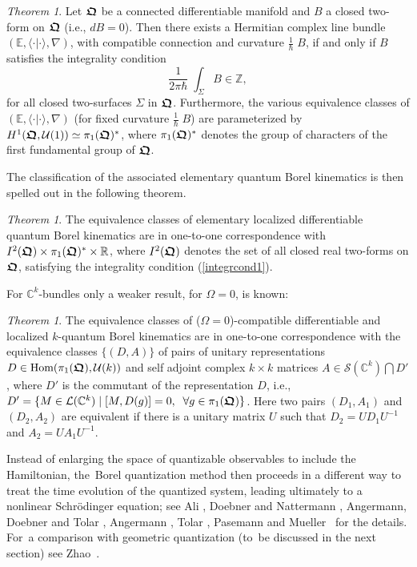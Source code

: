 \documentclass[11pt]{amsart}
\numberwithin{equation}{section}
\theoremstyle{remark}
\newtheorem{theorem}[defi]{Theorem}
\newcommand{\betheo}{\begin{theorem}}
\newcommand{\entheo}{\end{theorem}}
\newcommand{\be}{\begin{equation}}
\newcommand{\en}{\end{equation}}
\newcommand{\bfrakQ}{\mbox{\boldmath $\mathfrak Q$}}
\begin{document}
\betheo
Let $\bfrakQ$ be a connected differentiable manifold and $B$ a closed two-form
on $\bfrakQ$ (i.e., $dB = 0$). Then there exists a Hermitian complex line
bundle $(\mathbb E , \langle\cdot \vert\cdot\rangle , \nabla )$, with
compatible connection and curvature $\frac 1\hbar\;B$, if and only if $B$
satisfies the integrality condition
\be
  \frac 1{2\pi\hbar}\; \int_{\Sigma}B \in \mathbb Z ,
\label{integrcond1}
\en
for all closed two-surfaces $\Sigma$ in $\bfrakQ$. Furthermore, the various
equivalence classes of  $(\mathbb E , \langle\cdot\vert\cdot\rangle , \nabla )$
(for fixed curvature $\frac 1\hbar\;B$) are parameterized by $H^1 (\bfrakQ,
{\mathcal U}(1))\simeq \pi_1 (\bfrakQ )^*$, where $\pi_1 (\bfrakQ )^*$ denotes
the group of characters of the first fundamental group of $\bfrakQ$.
\entheo

The classification of the associated elementary quantum Borel kinematics is
then spelled out in the following theorem.

\betheo\label{classiftheo}
The equivalence classes of elementary localized
differentiable quantum Borel kinematics are in one-to-one correspondence with
$I^2 (\bfrakQ )\times \pi_1 (\bfrakQ )^* \times {\mathbb R}$, where $I^2
(\bfrakQ )$ denotes the set of all closed real two-forms on $\bfrakQ$,
satisfying the integrality condition (\ref{integrcond1}).
\entheo

For ${\mathbb C}^k$-bundles only a weaker result, for $\Omega = 0$, is known:

\betheo
The equivalence classes of ($\Omega = 0$)-compatible differentiable and
localized $k$-quantum Borel kinematics are in one-to-one correspondence with
the equivalence classes $\{(D, A)\}$ of pairs of unitary representations
$D \in \mbox{\rm Hom}(\pi_1 (\bfrakQ ), {\mathcal U} (k))$ and self adjoint
complex $k\times k$ matrices $A \in {\mathcal S}({\mathbb C}^k )\bigcap D'$,
where $D'$ is the commutant of the representation $D$, i.e.,
$D' = \{ M \in {\mathcal L} ({\mathbb C}^k )\;\vert\; [M, D(g)] = 0, \;\;
\forall g \in \pi_1 (\bfrakQ )\}$. Here two pairs $(D_1, A_1 )$ and
$(D_2 , A_2 )$ are equivalent if there is a unitary matrix $U$ such that
$D_2 = UD_1 U^{-1}$ and $A_2 = UA_1 U^{-1}$.
\entheo

Instead of enlarging the space of quantizable observables to include the
Hamiltonian, the~Borel quantization method then proceeds in a different way to
treat the time evolution of the quantized system, leading ultimately to a
nonlinear Schr\"odinger equation; see Ali \cite{bib:AliSurv}, Doebner and
Nattermann \cite{bib:DoebNa}, Angermann, Doebner and Tolar \cite{bib:ADT},
Angermann \cite{bib:Angm}, Tolar \cite{bib:Tolar}, Pasemann \cite{bib:Pasem}
and Mueller~\cite{bib:Muell} for the details. For~a comparison with geometric
quantization (to~be discussed in the next section) see Zhao~\cite{bib:ZhaoQ}.
\end{document}
